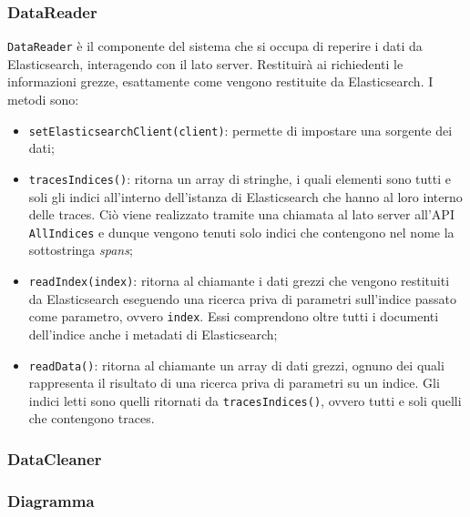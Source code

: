 \subsubsection{DataReader}
\label{sec:DataReader}
\texttt{DataReader} è il componente del sistema che si occupa di reperire i dati da Elasticsearch, interagendo con il lato server. Restituirà ai richiedenti le informazioni grezze, esattamente come vengono restituite da Elasticsearch. I metodi sono:

\begin{itemize}
	\item \texttt{setElasticsearchClient(client)}: permette di impostare una sorgente dei dati;
	\item \texttt{tracesIndices()}: ritorna un array di stringhe, i quali elementi sono tutti e soli gli indici all'interno dell'istanza di Elasticsearch che hanno al loro interno delle traces. Ciò viene realizzato tramite una chiamata al lato server all'API \texttt{AllIndices} e dunque vengono tenuti solo indici che contengono nel nome la sottostringa \emph{spans};
	\item \texttt{readIndex(index)}: ritorna al chiamante i dati grezzi che vengono restituiti da Elasticsearch eseguendo una ricerca priva di parametri sull'indice passato come parametro, ovvero \texttt{index}. Essi comprendono oltre tutti i documenti dell'indice anche i metadati di Elasticsearch;
	\item \texttt{readData()}: ritorna al chiamante un array di dati grezzi, ognuno dei quali rappresenta il risultato di una ricerca priva di parametri su un indice. Gli indici letti sono quelli ritornati da \texttt{tracesIndices()}, ovvero tutti e soli quelli che contengono traces.


\end{itemize}



\subsubsection{DataCleaner}
\label{sec:DataCleaner}
	\subsubsection{Diagramma}
	
